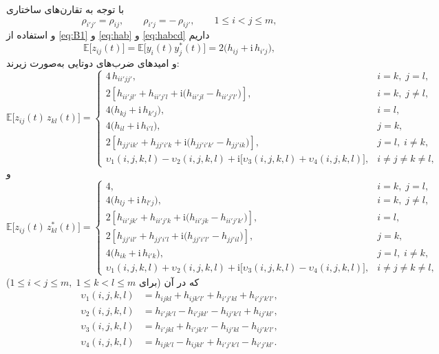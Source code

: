 \begin{اثبات}
	با توجه به تقارن‌های ساختاری
	\begin{equation}
		\rho_{i'j'}=\rho_{ij},\qquad \rho_{i'j}=-\,\rho_{ij'}, \qquad 1\le i<j\le m,
	\end{equation}
	و استفاده از \eqref{eq:B1} و \eqref{eq:hab} و \eqref{eq:habcd} داریم
	\begin{equation}
		\mathbb{E}\!\big[z_{ij}(t)\big]=\mathbb{E}\!\big[y_i(t)y_j^{*}(t)\big]
		=2\big(h_{ij}+\mathrm{i}\,h_{i'j}\big), \label{eq:Ezij}
	\end{equation}
	و امیدهای ضرب‌های دوتایی به‌صورت زیرند:
	\begin{equation}
		\mathbb{E}\!\big[z_{ij}(t)\,z_{kl}(t)\big]=
		\begin{cases}
			4\,h_{ii'jj'}, & i{=}k,\; j{=}l,\\[2pt]
			2\!\left[h_{ii'jl'}+h_{ii'j'l}+\mathrm{i}\big(h_{ii'jl}-h_{ii'j'l'}\big)\right], & i{=}k,\; j\neq l,\\[2pt]
			4\big(h_{kj}+\mathrm{i}\,h_{k'j}\big), & i{=}l,\\[2pt]
			4\big(h_{il}+\mathrm{i}\,h_{i'l}\big), & j{=}k,\\[2pt]
			2\!\left[h_{jj'ik'}+h_{jj'i'k}+\mathrm{i}\big(h_{jj'i'k'}-h_{jj'ik}\big)\right], & j{=}l,\; i\neq k,\\[2pt]
			\upsilon_{1}(i,j,k,l)-\upsilon_{2}(i,j,k,l)
			+\mathrm{i}\big[\upsilon_{3}(i,j,k,l)+\upsilon_{4}(i,j,k,l)\big], & i\neq j\neq k\neq l,
		\end{cases} \label{eq:Ezijkl}
	\end{equation}
	و
	\begin{equation}
		\mathbb{E}\!\big[z_{ij}(t)\,z^{*}_{kl}(t)\big]=
		\begin{cases}
			4, & i{=}k,\; j{=}l,\\[2pt]
			4\big(h_{lj}+\mathrm{i}\,h_{l'j}\big), & i{=}k,\; j\neq l,\\[2pt]
			2\!\left[h_{ii'jk'}+h_{ii'j'k}+\mathrm{i}\big(h_{ii'jk}-h_{ii'j'k'}\big)\right], & i{=}l,\\[2pt]
			2\!\left[h_{jj'il'}+h_{jj'i'l}+\mathrm{i}\big(h_{jj'i'l'}-h_{jj'il}\big)\right], & j{=}k,\\[2pt]
			4\big(h_{ik}+\mathrm{i}\,h_{i'k}\big), & j{=}l,\; i\neq k,\\[2pt]
			\upsilon_{1}(i,j,k,l)+\upsilon_{2}(i,j,k,l)
			+\mathrm{i}\big[\upsilon_{3}(i,j,k,l)-\upsilon_{4}(i,j,k,l)\big], & i\neq j\neq k\neq l,
		\end{cases}
		\label{eq:Ezijklst}
	\end{equation}
	که در آن (برای \(1\le i<j\le m,\;1\le k<l\le m\))
	\begin{subequations}
		\begin{align}
			\upsilon_{1}(i,j,k,l) &= h_{ijkl}+h_{ijk'l'}+h_{i'j'kl}+h_{i'j'k'l'}, \\
			\upsilon_{2}(i,j,k,l) &= h_{i'jk'l}-h_{i'jkl'}-h_{ij'k'l}+h_{ij'kl'}, \\
			\upsilon_{3}(i,j,k,l) &= h_{i'jkl}+h_{i'jk'l'}-h_{ij'kl}-h_{ij'k'l'}, \\
			\upsilon_{4}(i,j,k,l) &= h_{ijk'l}-h_{ijkl'}+h_{i'j'k'l}-h_{i'j'kl'}.
		\end{align}
	\end{subequations}


\end{اثبات}
